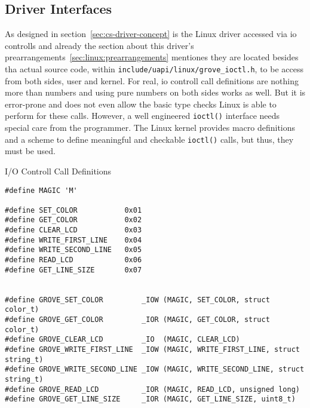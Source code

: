 \subsection{Driver Interfaces}

As designed in section~\ref{sec:cs-driver-concept} is the Linux driver accessed via \ac{io} controlls and already the section about this driver's prearrangements~\ref{sec:linux:prearrangements} mentiones they are located besides tha actual source code, within \texttt{include/uapi/linux/grove\_ioctl.h}, to be access from both sides, user and kernel.
For real, \ac{io} controll call definitions are nothing more than numbers and using pure numbers on both sides works as well.
But it is error-prone and does not even allow the basic type checks Linux is able to perform for these calls.
However, a well engineered \texttt{ioctl()} interface needs special care from the programmer.
The Linux kernel provides macro definitions and a scheme to define meaningful and checkable \texttt{ioctl()} calls, but thus, they must be used.

\begin{listing} [H]
    \caption{I/O Controll Call Definitions}
    \label{lst:ioctldefs}
    \begin{verbatim}
#define MAGIC 'M'

#define SET_COLOR           0x01
#define GET_COLOR           0x02
#define CLEAR_LCD           0x03
#define WRITE_FIRST_LINE    0x04
#define WRITE_SECOND_LINE   0x05
#define READ_LCD            0x06
#define GET_LINE_SIZE       0x07


#define GROVE_SET_COLOR         _IOW (MAGIC, SET_COLOR, struct color_t) 
#define GROVE_GET_COLOR         _IOR (MAGIC, GET_COLOR, struct color_t)
#define GROVE_CLEAR_LCD         _IO  (MAGIC, CLEAR_LCD)
#define GROVE_WRITE_FIRST_LINE  _IOW (MAGIC, WRITE_FIRST_LINE, struct string_t)
#define GROVE_WRITE_SECOND_LINE _IOW (MAGIC, WRITE_SECOND_LINE, struct string_t)
#define GROVE_READ_LCD          _IOR (MAGIC, READ_LCD, unsigned long)
#define GROVE_GET_LINE_SIZE     _IOR (MAGIC, GET_LINE_SIZE, uint8_t)
    \end{verbatim}
\end{listing}


